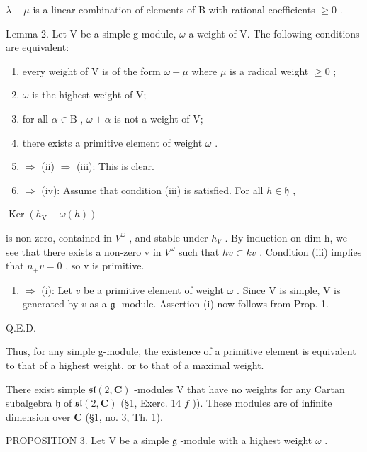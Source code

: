 \(\lambda - \mu\) is a linear combination of elements of B with rational coefficients \(\geq 0\) .

Lemma 2. Let V be a simple g-module, \(\omega\) a weight of V. The following conditions are equivalent:

\begin{enumerate}
\def\labelenumi{(\roman{enumi})}
\item
  every weight of V is of the form \(\omega -\mu\) where \(\mu\) is a radical weight \(\geq 0\) ;
\item
  \(\omega\) is the highest weight of V;
\item
  for all \(\alpha \in \mathrm{B}\) , \(\omega + \alpha\) is not a weight of V;
\item
  there exists a primitive element of weight \(\omega\) .
\item
  \(\Longrightarrow\) (ii) \(\Longrightarrow\) (iii): This is clear.
\item
  \(\Longrightarrow\) (iv): Assume that condition (iii) is satisfied. For all \(h\in \mathfrak{h}\) ,
\end{enumerate}

\(\operatorname {Ker}(h_{\mathrm{V}} - \omega (h))\)

is non-zero, contained in \(V^{\omega}\) , and stable under \(h_{V}\) . By induction on dim h, we see that there exists a non-zero v in \(V^{\omega}\) such that \(h v \subset kv\) . Condition (iii) implies that \(n_{+}v = 0\) , so v is primitive.

\begin{enumerate}
\def\labelenumi{(\roman{enumi})}
\setcounter{enumi}{3}
\tightlist
\item
  \(\Longrightarrow\) (i): Let \(v\) be a primitive element of weight \(\omega\) . Since V is simple, V is generated by \(v\) as a \(\mathfrak{g}\) -module. Assertion (i) now follows from Prop. 1.
\end{enumerate}

Q.E.D.

Thus, for any simple g-module, the existence of a primitive element is equivalent to that of a highest weight, or to that of a maximal weight.

There exist simple \(\mathfrak{sl}(2,\mathbf{C})\) -modules V that have no weights for any Cartan subalgebra \(\mathfrak{h}\) of \(\mathfrak{sl}(2,\mathbf{C})\) (§1, Exerc. 14 \(f\) )). These modules are of infinite dimension over \(\mathbf{C}\) (§1, no. 3, Th. 1).

PROPOSITION 3. Let V be a simple \(\mathfrak{g}\) -module with a highest weight \(\omega\) .

